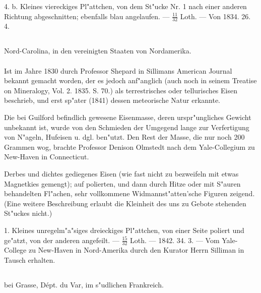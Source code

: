 \documentclass[a4paper, 11pt, oneside, polutonikogreek, german]{article}
\begin{document}
4. b. Kleines viereckiges Pl"attchen, von dem St"ucke Nr. 1 nach einer anderen Richtung abgeschnitten; ebenfalls blau angelaufen. --- $\mathfrak{\frac{11}{32}}$ Loth. --- Von 1834. 26. 4.
\subsection{}
\begin{center}

Nord-Carolina, in den vereinigten Staaten von Nordamerika.
\end{center}
\paragraph{}
Ist im Jahre 1830 durch Professor Shepard in Sillimans American Journal bekannt gemacht worden, der es jedoch anf"anglich (auch noch in seinem Treatise on Mineralogy, Vol. 2. 1835. S. 70.) als terrestrisches oder tellurisches Eisen beschrieb, und erst sp"ater (1841) dessen meteorische Natur erkannte.

\setlength{\leftskip}{10mm}
\setlength{\parindent}{0pt}

{\footnotesize Die bei Guilford befindlich gewesene Eisenmasse, deren urspr"ungliches Gewicht unbekannt ist, wurde von den Schmieden der Umgegend lange zur Verfertigung von N"ageln, Hufeisen u. dgl. ben"utzt. Den Rest der Masse, die nur noch 200 Grammen wog, brachte Professor Denison Olmstedt nach dem Yale-Collegium zu New-Haven in Connecticut.}

\setlength{\leftskip}{0pt}
\setlength{\parindent}{20pt}

Derbes und dichtes gediegenes Eisen (wie fast nicht zu bezweifeln mit etwas Magnetkies gemengt); auf polierten, und dann durch Hitze oder mit S"auren behandelten Fl"achen, sehr vollkommene Widmannst"atten'sche Figuren zeigend. (Eine weitere Beschreibung erlaubt die Kleinheit des uns zu Gebote stehenden St"uckes nicht.)

1. Kleines unregelm"a"siges dreieckiges Pl"attchen, von einer Seite poliert und ge"atzt, von der anderen angefeilt. --- $\mathfrak{\frac{15}{32}}$ Loth. --- 1842. 34. 3. --- Vom Yale-College zu New-Haven in Nord-Amerika durch den Kurator Herrn Silliman in Tausch erhalten.
\subsection[\swabfamily {Caille.}]{}
\begin{center}

bei Grasse, Dépt. du Var, im s"udlichen Frankreich.
\end{center}
\end{document}
